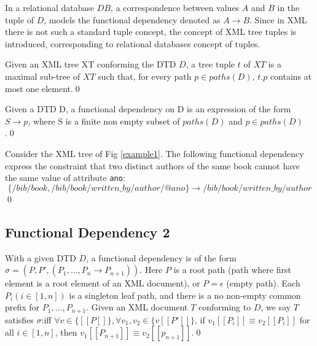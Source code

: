In a relational database $DB$, a correspondence between values $A$ and $B$ in the tuple of $D$, models the functional dependency denoted as $A \rightarrow B$. Since in XML there is not such a standard tuple concept, the concept of XML tree tuples is introduced, corresponding to relational databases concept of tuples.

\begin{define}\label{treeTuple}
Given an XML tree XT conforming the DTD $D$, a tree tuple $t$ of $XT$ is a maximal sub-tree of $XT$ such that, for every path $p \in paths(D)$, $t.p$ contains at most one element.\qed
\end{define}

\begin{define}\label{fd1}
Given a DTD D, a functional dependency on D is an expression of the form $S \rightarrow p$, where S is a finite non empty subset of $paths(D)$ and $p \in paths(D)$.\qed
\end{define}

\begin{example}
Consider the XML tree of Fig \ref{example1}. The following functional dependency express the constraint that two distinct authors of the same book cannot have the same value of attribute \texttt{ano}:$$\{/bib/book, /bib/book/written\_by/author/@ano\} \rightarrow /bib/book/written\_by/author$$\qed
\end{example}

\subsection{Functional Dependency 2}

\begin{define}\label{fd2}
With a given DTD $D$, a functional dependency is of the form $\sigma = (P, P', (P_1, \dots, P_n \rightarrow P_{n+1}))$. Here $P$ is a  root path (path where first element is a root element of an XML document), or $P = \epsilon$ (empty path). Each $P_i (i \in [1,n])$ is a singleton leaf path, and there is a no non-empty common prefix for $P_1, \dots, P_{n+1}$. Given an XML document $T$ conforming to $D$, we say $T$ satisfies $\sigma$:iff $\forall v \in \{[\![P]\!]\}, \forall v_1, v_2 \in \{v[\![P']\!]\}$, if $v_1[\![P_i]\!] \equiv v_2[\![P_i]\!]$ for all $i \in [1,n]$, then $v_1[\![P_{n+1}]\!] \equiv v_2[\![p_{n+1}]\!]$.\qed
\end{define}
